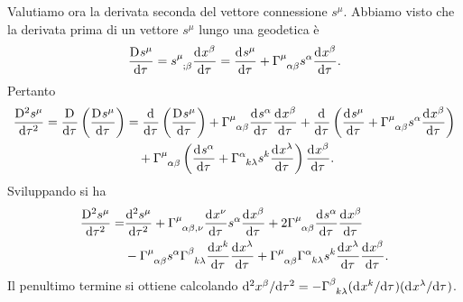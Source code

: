 Valutiamo ora la derivata seconda del vettore connessione $s^{\mu}$.  Abbiamo
visto che la derivata prima di un vettore $s^{\mu}$ lungo una geodetica è
\begin{equation}
  \covder{s^{\mu}}{\tau} = \tensor{s}{^{\mu}_{; \beta}}\toder{x^{\beta}}{\tau} =
  \toder{s^{\mu}}{\tau} + \tensor{\Gamma}{^{\mu}_{\alpha \beta}} s^{\alpha}
  \toder{x^{\beta}}{\tau}.
\end{equation}
Pertanto
\begin{equation}
  \begin{split}
    \covder[2]{s^{\mu}}{\tau} = \covder{}{\tau} \left( \covder{s^{\mu}}{\tau}
    \right) &= \toder{}{\tau} \left( \covder{s^{\mu}}{\tau} \right) +
    \tensor{\Gamma}{^{\mu}_{\alpha \beta}} \toder{s^{\alpha}}{\tau}
    \toder{x^{\beta}}{\tau} + \toder{}{\tau} \left( \toder{s^{\mu}}{\tau} +
      \tensor{\Gamma}{^{\mu}_{\alpha \beta}} s^{\alpha}
      \toder{x^{\beta}}{\tau}\right) \\
    &\quad{} + \tensor{\Gamma}{^{\mu}_{\alpha \beta}} \left(
      \toder{s^{\alpha}}{\tau} + \tensor{\Gamma}{^{\alpha}_{k \lambda}} s^{k}
      \toder{x^{\lambda}}{\tau} \right) \toder{x^{\beta}}{\tau}.
  \end{split}
\end{equation}
Sviluppando si ha
\begin{equation}
  \begin{split}
    \covder[2]{s^{\mu}}{\tau} = & \toder[2]{s^{\mu}}{\tau} +
    \tensor{\Gamma}{^{\mu}_{\alpha \beta , \nu}}
    \toder{x^{\nu}}{\tau} s^{\alpha} \toder{x^{\beta}}{\tau} + 2
    \tensor{\Gamma}{^{\mu}_{\alpha \beta}} \toder{s^{\alpha}}{\tau}
    \toder{x^{\beta}}{\tau} \\
    & - \tensor{\Gamma}{^{\mu}_{\alpha \beta}} s^{\alpha}
    \tensor{\Gamma}{^{\beta}_{k \lambda}} \toder{x^{k}}{\tau}
    \toder{x^{\lambda}}{\tau} + \tensor{\Gamma}{^{\mu}_{\alpha \beta}}
    \tensor{\Gamma}{^{\alpha}_{k \lambda}} s^{k} \toder{x^{\lambda}}{\tau}
    \toder{x^{\beta}}{\tau}.
  \end{split}
  \label{115}
\end{equation}
Il penultimo termine si ottiene calcolando $\ltoder[2]{x^{\beta}}{\tau}= -
\tensor{\Gamma}{^{\beta}_{k \lambda}}
(\ltoder{x^{k}}{\tau})(\ltoder{x^{\lambda}}{\tau})$.

